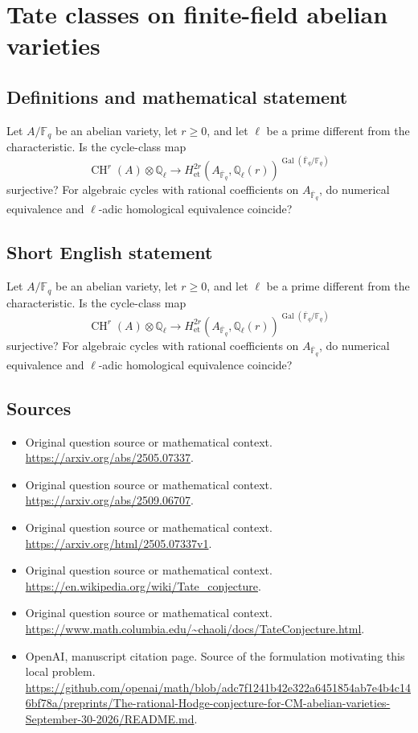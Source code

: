 \documentclass[11pt]{article}
\begin{document}
\section*{Tate classes on finite-field abelian varieties}\label{statement}
\subsection{Definitions and mathematical statement}
Let $A/\mathbb F_q$ be an abelian variety, let $r\geq0$, and let $\ell$ be a prime different from the characteristic. Is the cycle-class map
\[\operatorname{CH}^r(A)\otimes\mathbb Q_\ell\longrightarrow H_{\mathrm{et}}^{2r}(A_{\overline{\mathbb F}_q},\mathbb Q_\ell(r))^{\operatorname{Gal}(\overline{\mathbb F}_q/\mathbb F_q)}\]
surjective? For algebraic cycles with rational coefficients on $A_{\overline{\mathbb F}_q}$, do numerical equivalence and $\ell$-adic homological equivalence coincide?
\subsection{Short English statement}
Let $A/\mathbb F_q$ be an abelian variety, let $r\geq0$, and let $\ell$ be a prime different from the characteristic. Is the cycle-class map
\[\operatorname{CH}^r(A)\otimes\mathbb Q_\ell\longrightarrow H_{\mathrm{et}}^{2r}(A_{\overline{\mathbb F}_q},\mathbb Q_\ell(r))^{\operatorname{Gal}(\overline{\mathbb F}_q/\mathbb F_q)}\]
surjective? For algebraic cycles with rational coefficients on $A_{\overline{\mathbb F}_q}$, do numerical equivalence and $\ell$-adic homological equivalence coincide?
\subsection{Sources}
\begin{itemize}
\item[S1] Original question source or mathematical context.
\url{https://arxiv.org/abs/2505.07337}.
\item[S2] Original question source or mathematical context.
\url{https://arxiv.org/abs/2509.06707}.
\item[S3] Original question source or mathematical context.
\url{https://arxiv.org/html/2505.07337v1}.
\item[S4] Original question source or mathematical context.
\url{https://en.wikipedia.org/wiki/Tate_conjecture}.
\item[S5] Original question source or mathematical context.
\url{https://www.math.columbia.edu/~chaoli/docs/TateConjecture.html}.
\item[S6] OpenAI, manuscript citation page. Source of the formulation motivating this local problem.
\url{https://github.com/openai/math/blob/adc7f1241b42e322a6451854ab7e4b4c146bf78a/preprints/The-rational-Hodge-conjecture-for-CM-abelian-varieties-September-30-2026/README.md}.
\end{itemize}
\end{document}
